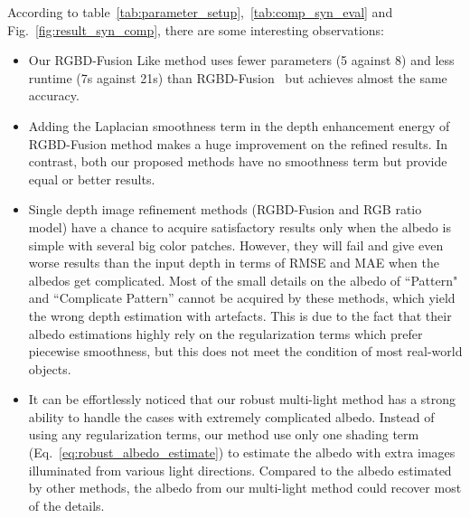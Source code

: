 According to table~\ref{tab:parameter_setup},~\ref{tab:comp_syn_eval} and Fig.~\ref{fig:result_syn_comp}, there are some interesting observations:
\begin{itemize}
    \item Our RGBD-Fusion Like method uses fewer parameters (5 against 8) and less runtime (7s against 21s) than RGBD-Fusion~\cite{or2015rgbd} but achieves almost the same accuracy.
    \item Adding the Laplacian smoothness term in the depth enhancement energy of RGBD-Fusion method makes a huge improvement on the refined results. In contrast, both our proposed methods have no smoothness term but provide equal or better results.
    \item Single depth image refinement methods (RGBD-Fusion and RGB ratio model) have a chance to acquire satisfactory results only when the albedo is simple with several big color patches. 
    However, they will fail and give even worse results than the input depth in terms of RMSE and MAE when the albedos get complicated. 
    Most of the small details on the albedo of ``Pattern" and ``Complicate Pattern'' cannot be acquired by these methods, which yield the wrong depth estimation with artefacts.
    This is due to the fact that their albedo estimations highly rely on the regularization terms which prefer piecewise smoothness, but this does not meet the condition of most real-world objects.
    \item It can be effortlessly noticed that our robust multi-light method has a strong ability to handle the cases with extremely complicated albedo. 
    Instead of using any regularization terms, our method use only one shading term (Eq.~\ref{eq:robust_albedo_estimate}) to estimate the albedo with extra images illuminated from various light directions. 
    Compared to the albedo estimated by other methods, the albedo from our multi-light method could recover most of the details.
\end{itemize}


